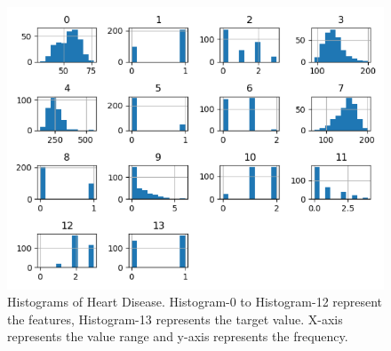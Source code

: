 \documentclass[letterpaper]{article}
\begin{document}
\begin{figure}[h!]
    \includegraphics[width=\linewidth]{pictures/heart.png}
    \caption{Histograms of Heart Disease. Histogram-0 to Histogram-12 represent the features, Histogram-13 represents the target value.
    X-axis represents the value range and y-axis represents the frequency.}
    \label{histogram of Heart Disease data}
\end{figure}
\end{document}
